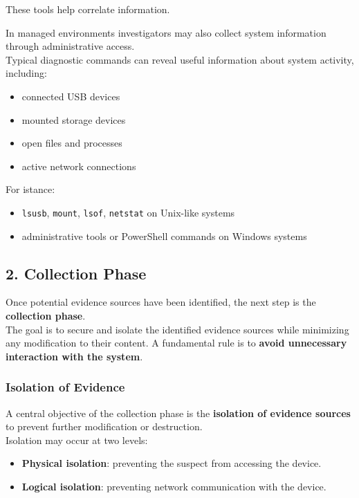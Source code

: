 \noindent
These tools help correlate information.
\medskip

\noindent
In managed environments investigators may also collect system information through administrative access.
\\
Typical diagnostic commands can reveal useful information about system activity, including:

\begin{itemize}
\item connected USB devices
\item mounted storage devices
\item open files and processes
\item active network connections
\end{itemize}

\noindent
For istance:

\begin{itemize}
\item \texttt{lsusb}, \texttt{mount}, \texttt{lsof}, \texttt{netstat} on Unix-like systems
\item administrative tools or PowerShell commands on Windows systems
\end{itemize}


\subsection{ 2. Collection Phase}

Once potential evidence sources have been identified, the next step is the \textbf{collection phase}.\\ 
The goal is to secure and isolate the identified evidence sources while minimizing any modification to their content.
\medskip
\noindent
A fundamental rule is to \textbf{avoid unnecessary interaction with the system}.

\subsubsection{Isolation of Evidence}

A central objective of the collection phase is the \textbf{isolation of evidence sources} to prevent further modification or destruction.\\
Isolation may occur at two levels:

\begin{itemize}
\item \textbf{Physical isolation}: preventing the suspect from accessing the device.
\item \textbf{Logical isolation}: preventing network communication with the device.
\end{itemize}

